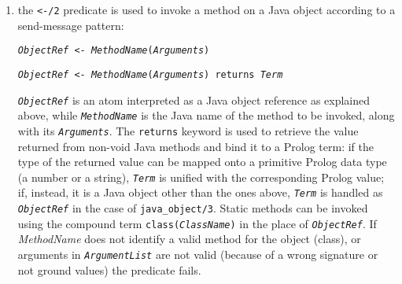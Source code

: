 \begin{enumerate}
  \item the \texttt{<-/2} predicate is used to invoke a method on a Java
        object according to a send-message pattern:
        \begin{center}
        \texttt{\textit{ObjectRef} <- \textit{MethodName}(\textit{Arguments})}

        \texttt{\textit{ObjectRef} <- \textit{MethodName}(\textit{Arguments})
                returns \textit{Term}}
        \end{center}
        \texttt{\textit{ObjectRef}} is an atom interpreted as a Java object
        reference as explained above, while \texttt{\textit{MethodName}}
        is the Java name of the method to be invoked, along with its
        \texttt{\textit{Arguments}}.
        The \texttt{returns} keyword is used to retrieve the value returned
        from non-void Java methods and bind it to a Prolog term: if
        the type of the returned value can be mapped onto a primitive Prolog
        data type (a number or a string), \texttt{\textit{Term}} is unified
        with the corresponding Prolog value; if, instead, it is a Java object
        other than the ones above, \texttt{\textit{Term}} is handled
        as \texttt{\textit{ObjectRef}} in the case of \texttt{java\_object/3}.
        Static methods can be invoked using the compound
        term \texttt{class(\textit{ClassName})} in the place
        of \texttt{\textit{ObjectRef}}.
        If \textit{MethodName} does not identify a valid method for the object (class),
        or arguments in \texttt{\textit{ArgumentList}} are not
        valid (because of a wrong signature or not ground values) the predicate fails.


\end{enumerate}
